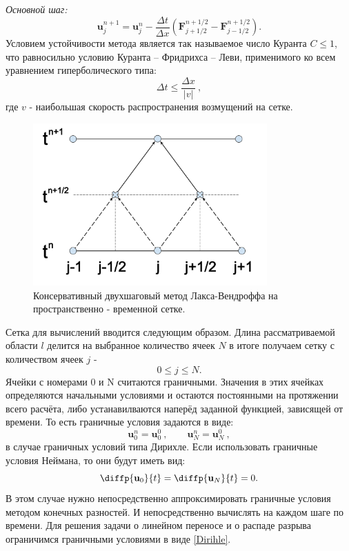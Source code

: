 \documentclass[a4paper]{article}
\begin{document}
	\textit{Основной шаг:}
	\begin{equation}\label{LW_main}
	\mathbf{u}_{j}^{n+1} = \mathbf{u}_{j}^{n} - \frac{\Delta t}{\Delta x} \left(
	\mathbf{F}_{j+1/2}^{n+1/2} - \mathbf{F}_{j-1/2}^{n+1/2}				 \right) .
	\end{equation}
	Условием устойчивости метода является так называемое число Куранта $C \leqslant 1$, что равносильно условию Куранта -- Фридрихса -- Леви, применимого ко всем уравнением гиперболического типа: %
	\begin{equation}
	\Delta t \leqslant \dfrac{\Delta x}{|v|} \:,
	\end{equation}
	где $v$ - наибольшая скорость распространения возмущений на сетке.
	\begin{figure}
		\centering
		\includegraphics[width=0.8\textwidth]{Lax-Wendroff.pdf}
		\caption{Консервативный двухшаговый метод Лакса-Вендроффа на пространственно - временной сетке.}
		\label{LW_picture}
	\end{figure}
	Сетка для вычислений вводится следующим образом. Длина рассматриваемой области $l$ делится на выбранное количество ячеек $N$ в итоге получаем сетку с количеством ячеек $j$ - 
	\[
		0 \leqslant j \leqslant N .
	\]
	Ячейки с номерами 0 и N считаются граничными. Значения в этих ячейках определяются начальными условиями и остаются постоянными на протяжении всего расчёта, либо устанавилваются наперёд заданной функцией, зависящей от времени. То есть граничные условия задаются в виде:
	\begin{equation}\label{Dirihle}
		\mathbf{u}_0^n = \mathbf{u}_0^0	\:,	\qquad	\mathbf{u}_N^n = \mathbf{u}_N^0 \:,
	\end{equation}
	в случае граничных условий типа Дирихле. Если использовать граничные условия Неймана, то они будут иметь вид:
	\begin{equation}
		\diffp{\mathbf{u}_{0}}{t} = \diffp{\mathbf{u}_{N}}{t} = 0 .
	\end{equation}
	В этом случае нужно непосредственно аппроксимировать граничные условия методом конечных разностей. И непосредственно вычислять на каждом шаге по времени. 
	Для решения задачи о линейном переносе и о распаде разрыва ограничимся граничными условиями в виде \eqref{Dirihle}.
		
\end{document}
